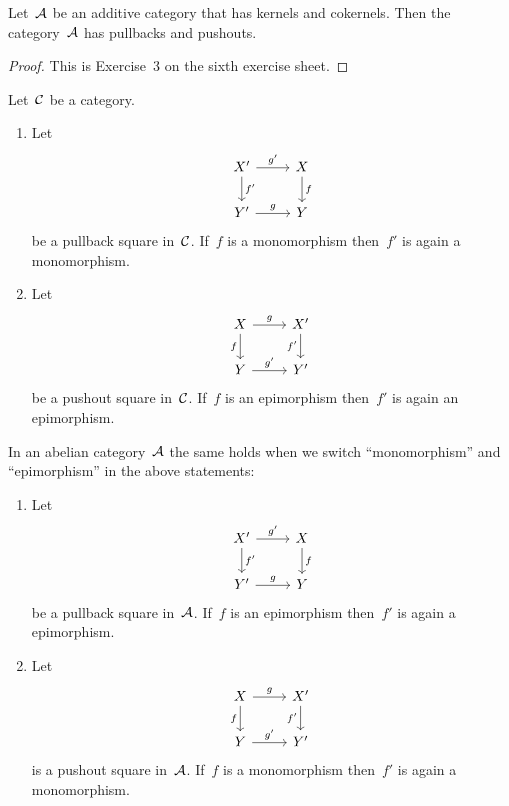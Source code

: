 \begin{lemma*}
  Let~$\mathcal{A}$ be an additive category that has kernels and cokernels.
  Then the category~$\mathcal{A}$ has pullbacks and pushouts.
\end{lemma*}


\begin{proof}
  This is Exercise~3 on the sixth exercise sheet.
\end{proof}


\begin{proposition*}
  \label{mono epi under pull push}
  Let~$\mathcal{C}$ be a category.
  \begin{enumerate}
    \item
      \label{pullback of mono}
      Let
      \[
        \begin{tikzcd}
            X'
            \arrow{r}[above]{g'}
            \arrow{d}[right]{f'}
          & X
            \arrow{d}[right]{f}
          \\
            Y'
            \arrow{r}[above]{g}
          & Y
        \end{tikzcd}
      \]
      be a pullback square in~$\mathcal{C}$.
      If~$f$ is a monomorphism then~$f'$ is again a monomorphism.
    \item
      Let
      \[
        \begin{tikzcd}
            X
            \arrow{r}[above]{g}
            \arrow{d}[left]{f}
          & X'
            \arrow{d}[left]{f'}
          \\
            Y
            \arrow{r}[above]{g'}
          & Y'
        \end{tikzcd}
      \]
      be a pushout square in~$\mathcal{C}$.
      If~$f$ is an epimorphism then~$f'$ is again an epimorphism.
  \end{enumerate}
  In an abelian category~$\mathcal{A}$ the same holds when we switch \enquote{monomorphism} and \enquote{epimorphism} in the above statements:
  \begin{enumerate}[resume]
    \item
      \label{pullback of epi}
      Let
      \[
        \begin{tikzcd}
            X'
            \arrow{r}[above]{g'}
            \arrow{d}[right]{f'}
          & X
            \arrow{d}[right]{f}
          \\
            Y'
            \arrow{r}[above]{g}
          & Y
        \end{tikzcd}
      \]
      be a pullback square in~$\mathcal{A}$.
      If~$f$ is an epimorphism then~$f'$ is again a epimorphism.
    \item
      Let
      \[
        \begin{tikzcd}
            X
            \arrow{r}[above]{g}
            \arrow{d}[left]{f}
          & X'
            \arrow{d}[left]{f'}
          \\
            Y
            \arrow{r}[above]{g'}
          & Y'
        \end{tikzcd}
      \]
      is a pushout square in~$\mathcal{A}$.
      If~$f$ is a monomorphism then~$f'$ is again a monomorphism.
  \end{enumerate}
\end{proposition*}


